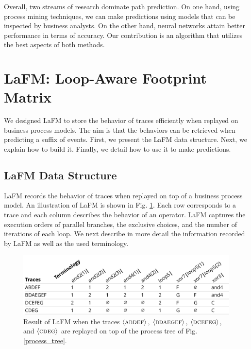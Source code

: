 \documentclass[runningheads]{llncs}
\begin{document}
Overall, two streams of research dominate path prediction. On one hand, using process mining techniques, we can make predictions using models that can be inspected by business analysts. On the other hand, neural networks attain better performance in terms of accuracy. Our contribution is an algorithm that utilizes the best aspects of both methods.


\section{LaFM: Loop-Aware Footprint Matrix}
\label{Section:LaFM}
We designed LaFM to store the behavior of traces efficiently when replayed on business process models. The aim is that the behaviors can be retrieved when predicting a suffix of events. First, we present the LaFM data structure. Next, we explain how to build it. Finally, we detail how to use it to make predictions.


\subsection{LaFM Data Structure}
LaFM records the behavior of traces when replayed on top of a business process model. An illustration of LaFM is shown in Fig. \ref{LaFM}. Each row corresponds to a trace and each column describes the behavior of an operator. LaFM captures the execution orders of parallel branches, the exclusive choices, and the number of iterations of each loop. We next describe in more detail the information recorded by LaFM as well as the used terminology.

\begin{figure}[H]
\begin{center}
\includegraphics[width=1\columnwidth]{02-schema/LaFM.pdf}
\caption{Result of LaFM when the traces $\langle \textsc{abdef} \rangle$, $\langle \textsc{bdaegef} \rangle$, $\langle \textsc{dcefeg} \rangle$, and $\langle \textsc{cdeg} \rangle$ are replayed on top of the process tree of Fig. \ref{process_tree}. }
\label{LaFM}
\end{center}
\end{figure}
\end{document}
